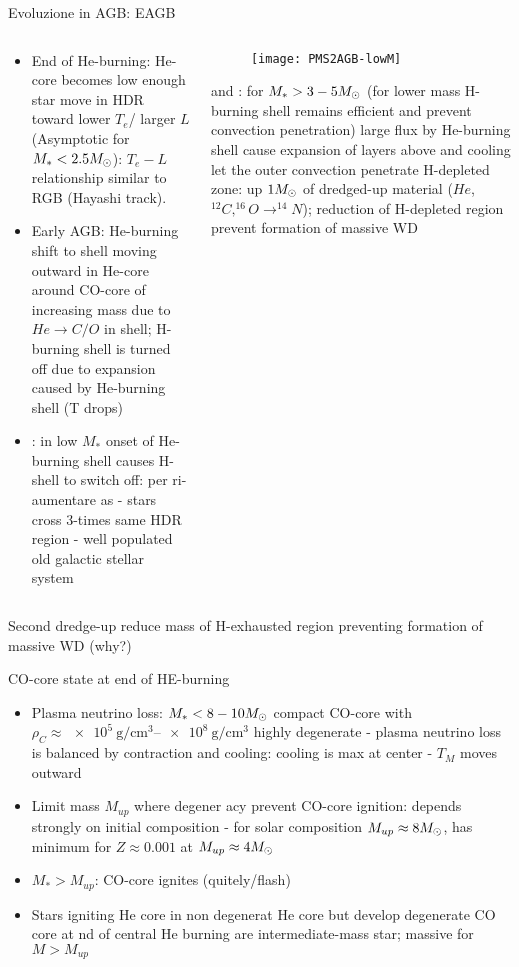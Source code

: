 \begin{frame}{Evoluzione in AGB: EAGB}
\begin{columns}[T]
	\begin{column}{0.45\textwidth}
	\begin{itemize}
	\item End of He-burning: He-core becomes low enough star move in HDR toward lower $T_e$/ larger $L$ (Asymptotic for $M_*<2.5M_{\odot}$): $T_e-L$ relationship similar to RGB (Hayashi track).
	\item Early AGB: He-burning shift to shell moving outward in He-core around CO-core of increasing mass due to $He\to C/O$ in shell; H-burning shell is turned off due to expansion caused by He-burning shell (T drops)
	\item {}: in low $M_*$ onset of He-burning shell causes H-shell to switch off:  per ri-aumentare as  - stars cross 3-times same HDR region - well populated old galactic stellar system
	\end{itemize}
	\end{column}
	\begin{column}{0.50\textwidth}
	\begin{figure}[!ht]
	\texttt{[image: PMS2AGB-lowM]}\label{fig:PMS2AGB-lowM}
	\end{figure}
     and : for $M_*>3-5M_{\odot}$ (for lower mass H-burning shell remains efficient and prevent convection penetration) large flux by He-burning shell cause expansion of layers above and cooling let the outer convection penetrate H-depleted zone: up $1M_{\odot}$ of dredged-up material ($He$, $^{12}C,^{16}O\to^{14}N$); reduction of H-depleted region prevent formation of massive WD
\end{column}\end{columns}
Second dredge-up reduce mass of H-exhausted region preventing formation of massive WD (why?)
\end{frame}

\begin{frame}{CO-core state at end of HE-burning} 
\begin{itemize}
\item Plasma neutrino loss: $M_*<8-10M_{\odot}$ compact  CO-core with $\rho_C\approx\SIrange{e5}{e8}{\gram\per\cubic\cm}$ highly degenerate - plasma neutrino loss is balanced by contraction and cooling: cooling is max at center - $T_M$ moves outward
\item Limit mass $M_{up}$ where \Pelectron degener acy prevent CO-core ignition: depends strongly on initial composition - for solar composition $M_{up}\approx8M_{\odot}$, has minimum for $Z\approx0.001$ at $M_{up}\approx4M_{\odot}$
\item $M_*>M_{up}$: CO-core ignites (quitely/flash)
\item Stars igniting He core in non degenerat He core but develop degenerate CO core at nd of central He burning are intermediate-mass star; massive for $M>M_{up}$
\end{itemize}
\end{frame}
 
